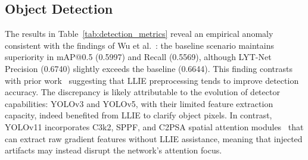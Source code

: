 \documentclass[conference]{IEEEtran}
\begin{document}
\begin{table}[htbp]
\centering
\caption{Image Quality Metrics Across LLIE Scenarios}
\label{tab:image_quality}
\end{table}


\subsection{Object Detection}

The results in Table~\ref{tab:detection_metrics} reveal an empirical anomaly consistent with the findings of Wu et al.~\cite{wu2024llieeffect}: the baseline scenario maintains superiority in mAP@0.5 (0.5997) and Recall (0.5569), although LYT-Net Precision (0.6740) slightly exceeds the baseline (0.6644). This finding contrasts with prior work~\cite{wang2023yolov5lowlight,shovo2024lowlight} suggesting that LLIE preprocessing tends to improve detection accuracy. The discrepancy is likely attributable to the evolution of detector capabilities: YOLOv3 and YOLOv5, with their limited feature extraction capacity, indeed benefited from LLIE to clarify object pixels. In contrast, YOLOv11 incorporates C3k2, SPPF, and C2PSA spatial attention modules~\cite{khanam2024yolov11} that can extract raw gradient features without LLIE assistance, meaning that injected artifacts may instead disrupt the network's attention focus.
\end{document}
